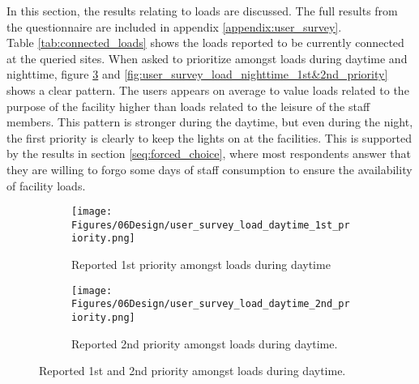 In this section, the results relating to loads are discussed. The full results from the questionnaire are included in appendix \ref{appendix:user_survey}. \\

Table \ref{tab:connected_loads} shows the loads reported to be currently connected at the queried sites. When asked to prioritize amongst loads during daytime and nighttime, figure \ref{fig:user_survey_load_daytime_1st&2nd_priority} and \ref{fig:user_survey_load_nighttime_1st&2nd_priority} shows a clear pattern. The users appears on average to value loads related to the purpose of the facility higher than loads related to the leisure of the staff members. This pattern is stronger during the daytime, but even during the night, the first priority is clearly to keep the lights on at the facilities. This is supported by the results in section \ref{seq:forced_choice}, where most respondents answer that they are willing to forgo some days of staff consumption to ensure the availability of facility loads.

\begin{figure}[!h]
  \centering

  \begin{subfigure}{\textwidth}
    \centering
    \texttt{[image: Figures/06Design/user\_survey\_load\_daytime\_1st\_priority.png]}
    \caption[User survey: Daytime 1st priority]{Reported 1st priority amongst loads during daytime}
    \label{fig:user_survey_load_daytime_1st_priority}
  \end{subfigure}

  \vspace{0.5cm}

  \begin{subfigure}{\textwidth}
    \centering
    \texttt{[image: Figures/06Design/user\_survey\_load\_daytime\_2nd\_priority.png]}
    \caption[User survey: Daytime 2nd priority]{Reported 2nd priority amongst loads during daytime.}
    \label{fig:user_survey_load_daytime_2nd_priority}
  \end{subfigure}

  \caption[User survey: Daytime priority]{Reported 1st and 2nd priority amongst loads during daytime.}
  \label{fig:user_survey_load_daytime_1st&2nd_priority}
\end{figure}


